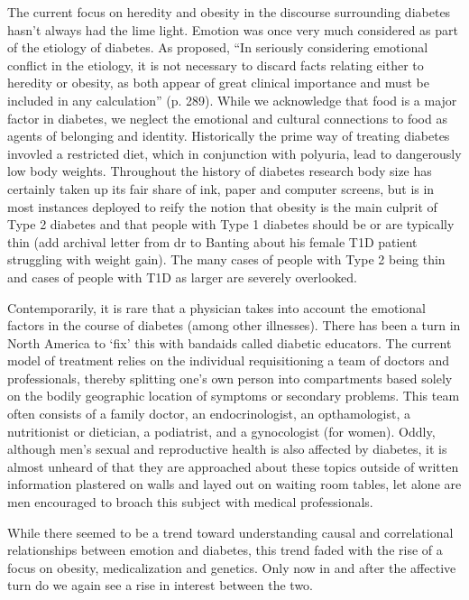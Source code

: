 \documentclass[12pt]{article}
\begin{document}
The current focus on heredity and obesity in the discourse surrounding diabetes hasn't always had the lime light. Emotion was once very much considered as part of the etiology of diabetes. As \citet{daniels_role_1948} proposed,
``In seriously considering emotional conflict in the etiology, it is not necessary to discard facts relating either to heredity or obesity, as both appear of great clinical importance and must be included in any calculation'' (p. 289). While we acknowledge that food is a major factor in diabetes, we neglect the emotional and cultural connections to food as agents of belonging and identity. Historically the prime way of treating diabetes invovled a restricted diet, which in conjunction with polyuria, lead to dangerously low body weights. Throughout the history of diabetes research body size has certainly taken up its fair share of ink, paper and computer screens, but is in most instances deployed to reify the notion that obesity is the main culprit of Type 2 diabetes and that people with Type 1 diabetes should be or are typically thin (add archival letter from dr to Banting about his female T1D patient struggling with weight gain). The many cases of people with Type 2 being thin and cases of people with T1D as larger are severely overlooked. 

Contemporarily, it is rare that a physician takes into account the emotional factors in the course of diabetes (among other illnesses). There has been a turn in North America to `fix' this with bandaids called diabetic educators. The current model of treatment relies on the individual requisitioning a team of doctors and professionals, thereby splitting one's own person into compartments based solely on the bodily geographic location of symptoms or secondary problems. This team often consists of a family doctor, an endocrinologist, an opthamologist, a nutritionist or dietician, a podiatrist, and a gynocologist (for women). Oddly, although men's sexual and reproductive health is also affected by diabetes, it is almost unheard of that they are approached about these topics outside of written information plastered on walls and layed out on waiting room tables, let alone are men encouraged to broach this subject with medical professionals. 

While there seemed to be a trend toward understanding causal and correlational relationships between emotion and diabetes, this trend faded with the rise of a focus on obesity, medicalization and genetics. Only now in and after the affective turn do we again see a rise in interest between the two. 
\end{document}
